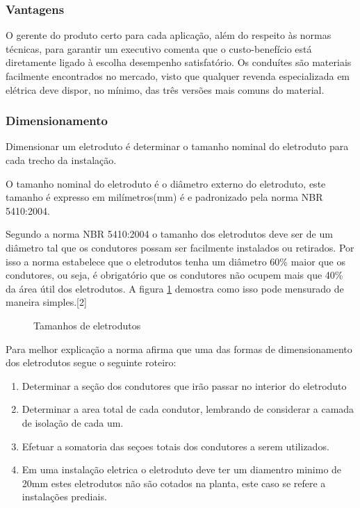 \subsubsection{Vantagens}

O gerente do produto certo para cada aplicação, além do respeito às normas técnicas, para garantir um executivo comenta que o custo-benefício está diretamente ligado à escolha desempenho satisfatório.  Os conduítes são materiais facilmente encontrados no mercado, visto que qualquer revenda especializada em elétrica deve dispor, no mínimo, das três versões mais comuns do material.

\subsubsection{Dimensionamento}
Dimensionar um eletroduto é determinar o tamanho nominal do eletroduto para cada trecho da instalação.

O tamanho nominal do eletroduto é o diâmetro externo do eletroduto, este tamanho é expresso em milímetros(mm) é e padronizado pela norma NBR 5410:2004.

Segundo a norma NBR 5410:2004 o tamanho dos eletrodutos deve ser de um diâmetro tal que os condutores possam ser facilmente instalados ou retirados. Por isso a norma estabelece que o eletrodutos tenha um diâmetro 60\% maior que os condutores, ou seja, é obrigatório que os condutores não ocupem mais que 40\% da área útil dos eletrodutos. A figura \ref{tamanhos-eletrodutos} demostra como isso pode mensurado de maneira simples.[2]

\begin{figure}[h]
	\centering
	\caption{Tamanhos de eletrodutos}
	\label{tamanhos-eletrodutos}
\end{figure}

Para melhor explicação a norma afirma que uma das formas de dimensionamento dos eletrodutos segue o seguinte roteiro:

\begin{enumerate}

	\item Determinar a seção dos condutores que irão passar no interior do eletroduto
	\item Determinar a area total de cada condutor, lembrando de considerar a camada de isolação de cada um.
	\item Efetuar a somatoria das seçoes totais dos condutores a serem utilizados.
	\item Em uma instalação eletrica o eletroduto deve ter um diamentro minimo de 20mm estes eletrodutos não são cotados na planta, este caso se refere a instalações prediais.
\end{enumerate}

